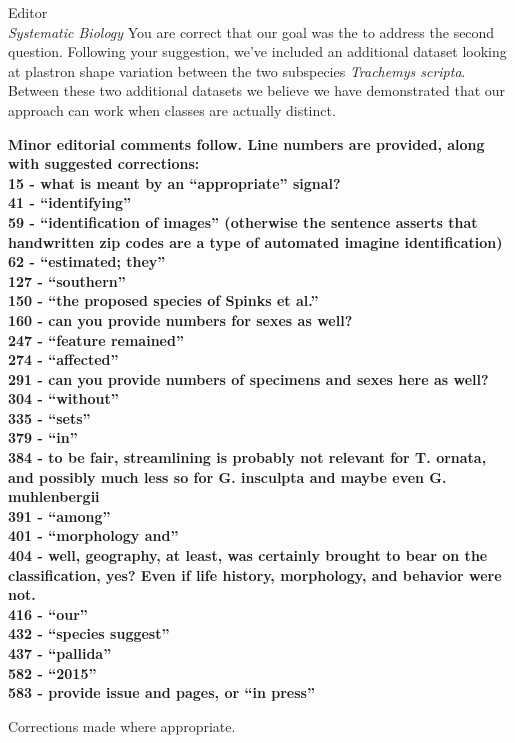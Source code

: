\documentclass{letter}
\begin{document}
\begin{letter}{Editor \\ \textit{Systematic Biology}}
  You are correct that our goal was the to address the second question. Following your suggestion, we've included an additional dataset looking at plastron shape variation between the two subspecies \textit{Trachemys scripta}. Between these two additional datasets we believe we have demonstrated that our approach can work when classes are actually distinct. 
  
  

  \textbf{Minor editorial comments follow. Line numbers are provided, along with suggested corrections: \\
    15 - what is meant by an ``appropriate'' signal? \\
    41 - ``identifying'' \\
    59 - ``identification of images'' (otherwise the sentence asserts that handwritten zip codes are a type of automated imagine identification) \\
    62 - ``estimated; they'' \\
    127 - ``southern'' \\
    150 - ``the proposed species of Spinks et al.'' \\
    160 - can you provide numbers for sexes as well? \\
    247 - ``feature remained'' \\
    274 - ``affected'' \\
    291 - can you provide numbers of specimens and sexes here as well? \\
    304 - ``without'' \\
    335 - ``sets'' \\
    379 - ``in'' \\
    384 - to be fair, streamlining is probably not relevant for T. ornata, and possibly much less so for G. insculpta and maybe even G. muhlenbergii \\
    391 - ``among'' \\
    401 - ``morphology and'' \\
    404 - well, geography, at least, was certainly brought to bear on the classification, yes? Even if life history, morphology, and behavior were not. \\
    416 - ``our'' \\
    432 - ``species suggest'' \\
    437 - ``pallida'' \\
    582 - ``2015'' \\
  583 - provide issue and pages, or ``in press'' }

  Corrections made where appropriate.




\end{letter}
\end{document}
